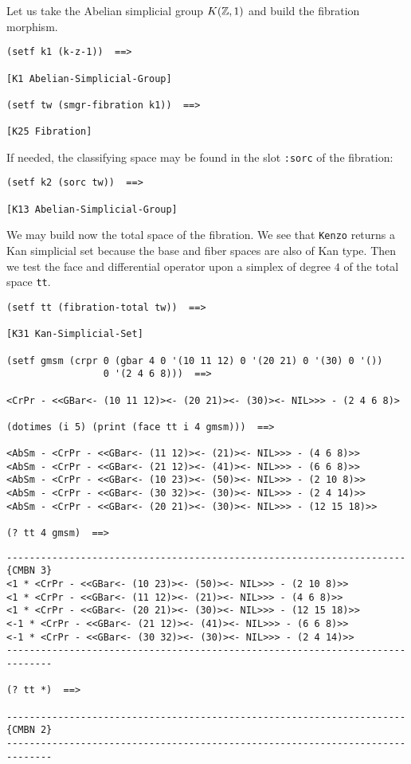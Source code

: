 Let us take the Abelian simplicial group $K({{\Bbb Z}},1)$ and  build the fibration morphism.
{\footnotesize\begin{verbatim}
(setf k1 (k-z-1))  ==>

[K1 Abelian-Simplicial-Group]

(setf tw (smgr-fibration k1))  ==>

[K25 Fibration]
\end{verbatim}}
If needed, the classifying space may be found in the slot {\tt :sorc} of the fibration:
{\footnotesize\begin{verbatim}
(setf k2 (sorc tw))  ==>

[K13 Abelian-Simplicial-Group]
\end{verbatim}}
We may build now the total space of the fibration. We see that {\tt Kenzo} returns
a Kan simplicial set because the base and fiber spaces are also of
Kan type. Then we test the face and differential operator upon a simplex of degree $4$ of
the total space {\tt tt}.
{\footnotesize\begin{verbatim}
(setf tt (fibration-total tw))  ==>

[K31 Kan-Simplicial-Set]

(setf gmsm (crpr 0 (gbar 4 0 '(10 11 12) 0 '(20 21) 0 '(30) 0 '())
                 0 '(2 4 6 8)))  ==>

<CrPr - <<GBar<- (10 11 12)><- (20 21)><- (30)><- NIL>>> - (2 4 6 8)>

(dotimes (i 5) (print (face tt i 4 gmsm)))  ==>

<AbSm - <CrPr - <<GBar<- (11 12)><- (21)><- NIL>>> - (4 6 8)>> 
<AbSm - <CrPr - <<GBar<- (21 12)><- (41)><- NIL>>> - (6 6 8)>> 
<AbSm - <CrPr - <<GBar<- (10 23)><- (50)><- NIL>>> - (2 10 8)>> 
<AbSm - <CrPr - <<GBar<- (30 32)><- (30)><- NIL>>> - (2 4 14)>> 
<AbSm - <CrPr - <<GBar<- (20 21)><- (30)><- NIL>>> - (12 15 18)>> 

(? tt 4 gmsm)  ==>
\end{verbatim}}
\newpage
{\footnotesize\begin{verbatim}
----------------------------------------------------------------------{CMBN 3}
<1 * <CrPr - <<GBar<- (10 23)><- (50)><- NIL>>> - (2 10 8)>>
<1 * <CrPr - <<GBar<- (11 12)><- (21)><- NIL>>> - (4 6 8)>>
<1 * <CrPr - <<GBar<- (20 21)><- (30)><- NIL>>> - (12 15 18)>>
<-1 * <CrPr - <<GBar<- (21 12)><- (41)><- NIL>>> - (6 6 8)>>
<-1 * <CrPr - <<GBar<- (30 32)><- (30)><- NIL>>> - (2 4 14)>>
------------------------------------------------------------------------------

(? tt *)  ==>

----------------------------------------------------------------------{CMBN 2}
------------------------------------------------------------------------------
\end{verbatim}}

